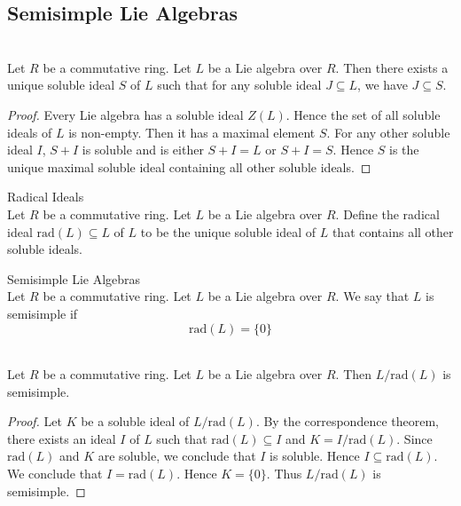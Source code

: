\documentclass[a4paper]{article}
\begin{document}
\subsection{Semisimple Lie Algebras}
\begin{lmm}{}{}\\
Let $R$ be a commutative ring. Let $L$ be a Lie algebra over $R$. Then there exists a unique soluble ideal $S$ of $L$ such that for any soluble ideal $J\subseteq L$, we have $J\subseteq S$. 
\begin{proof}
Every Lie algebra has a soluble ideal $Z(L)$. Hence the set of all soluble ideals of $L$ is non-empty. Then it has a maximal element $S$. For any other soluble ideal $I$, $S+I$ is soluble and is either $S+I=L$ or $S+I=S$. Hence $S$ is  the unique maximal soluble ideal containing all other soluble ideals. 
\end{proof}
\end{lmm}

\begin{defn}{Radical Ideals}{}\\
Let $R$ be a commutative ring. Let $L$ be a Lie algebra over $R$. Define the radical ideal $\text{rad}(L)\subseteq L$ of $L$ to be the unique soluble ideal of $L$ that contains all other soluble ideals. 
\end{defn}

\begin{defn}{Semisimple Lie Algebras}{}{}\\
Let $R$ be a commutative ring. Let $L$ be a Lie algebra over $R$. We say that $L$ is semisimple if $$\text{rad}(L)=\{0\}$$
\end{defn}

\begin{lmm}{}{}\\
Let $R$ be a commutative ring. Let $L$ be a Lie algebra over $R$. Then $L/\text{rad}(L)$ is semisimple. 
\begin{proof}
Let $K$ be a soluble ideal of $L/\text{rad}(L)$. By the correspondence theorem, there exists an ideal $I$ of $L$ such that $\text{rad}(L)\subseteq I$ and $K=I/\text{rad}(L)$. Since $\text{rad}(L)$ and $K$ are soluble, we conclude that $I$ is soluble. Hence $I\subseteq\text{rad}(L)$. We conclude that $I=\text{rad}(L)$. Hence $K=\{0\}$. Thus $L/\text{rad}(L)$ is semisimple. 
\end{proof}
\end{lmm}
\end{document}
